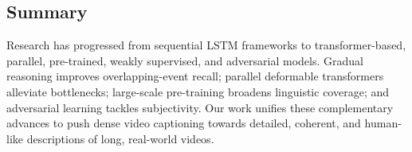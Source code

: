 \subsection{Summary}
Research has progressed from sequential LSTM frameworks to transformer-based, parallel, pre-trained, weakly supervised, and adversarial models.  
Gradual reasoning improves overlapping-event recall; parallel deformable transformers alleviate bottlenecks; large-scale pre-training broadens linguistic coverage; and adversarial learning tackles subjectivity.  
Our work unifies these complementary advances to push dense video captioning towards detailed, coherent, and human-like descriptions of long, real-world videos.
